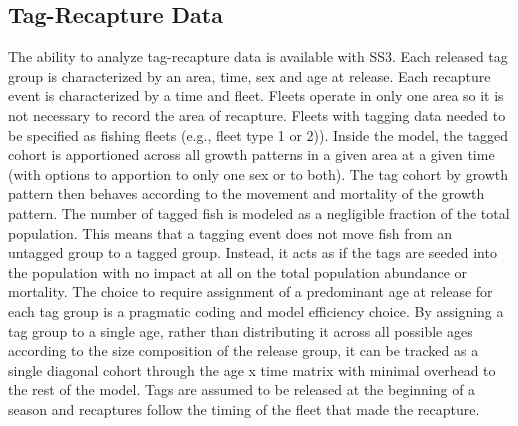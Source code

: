 \subsection{Tag-Recapture Data}
The ability to analyze tag-recapture data is available with SS3. Each released tag group is characterized by an area, time, sex and age at release. Each recapture event is characterized by a time and fleet. Fleets operate in only one area so it is not necessary to record the area of recapture. Fleets with tagging data needed to be specified as fishing fleets (e.g., fleet type 1 or 2)).  Inside the model, the tagged cohort is apportioned across all growth patterns in a given area at a given time (with options to apportion to only one sex or to both). The tag cohort by growth pattern then behaves according to the movement and mortality of the growth pattern. The number of tagged fish is modeled as a negligible fraction of the total population. This means that a tagging event does not move fish from an untagged group to a tagged group. Instead, it acts as if the tags are seeded into the population with no impact at all on the total population abundance or mortality. The choice to require assignment of a predominant age at release for each tag group is a pragmatic coding and model efficiency choice. By assigning a tag group to a single age, rather than distributing it across all possible ages according to the size composition of the release group, it can be tracked as a single diagonal cohort through the age x time matrix with minimal overhead to the rest of the model.  Tags are assumed to be released at the beginning of a season and recaptures follow the timing of the fleet that made the recapture.

